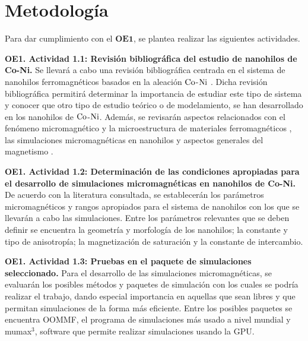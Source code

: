 \newpage
\section{Metodología}

Para dar cumplimiento con el $\textbf{OE1}$, se plantea realizar las siguientes actividades.

\vspace{10pt}

\textbf{OE1. Actividad 1.1: Revisión bibliográfica del estudio de nanohilos de Co-Ni.} Se llevará a cabo una revisión bibliográfica centrada en el sistema de nanohilos ferromagnéticos basados en la aleación $\ce{Co}$-$\ce{Ni}$ \cite{CylindricalMagneticNonowires,ExoticMagneticConfiguration,FieldTuneble}. Dicha revisión bibliográfica permitirá determinar la importancia de estudiar este tipo de sistema y conocer que otro tipo de estudio teórico o de modelamiento, se han desarrollado en los nanohilos de $\ce{Co}$-$\ce{Ni}$. Además, se revisarán aspectos relacionados con el fenómeno micromagnético y la microestructura de materiales ferromagnéticos \cite{Exl2020,KronmüllerMicromagnetism}, las simulaciones micromagnéticas en nanohilos \cite{Kumar_2017,miltat2007numerical} y aspectos generales del magnetismo \cite{jackson2012classical,coey_2010,OHandley}.

\vspace{10pt}
    
\textbf{OE1. Actividad 1.2: Determinación de las condiciones apropiadas para el desarrollo de simulaciones micromagnéticas en nanohilos de Co-Ni.} De acuerdo con la literatura consultada, se establecerán los parámetros micromagnéticos y rangos apropiados para el sistema de nanohilos con los que se llevarán a cabo las simulaciones. Entre los parámetros relevantes que se deben definir se encuentra la geometría y morfología de los nanohilos; la constante y tipo de anisotropía; la magnetización de saturación y la constante de intercambio.

\vspace{10pt}

\textbf{OE1. Actividad 1.3: Pruebas en el paquete de simulaciones seleccionado.} Para el desarrollo de las simulaciones micromagnéticas, se evaluarán los posibles métodos y paquetes de simulación con los cuales se podría realizar el trabajo, dando especial importancia en aquellas que sean libres y que permitan simulaciones de la forma más eficiente. Entre los posibles paquetes se encuentra OOMMF, el programa de simulaciones más usado a nivel mundial y mumax$^3$, software que permite realizar simulaciones usando la GPU.

